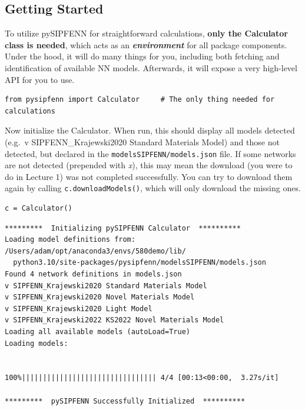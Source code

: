 \hypertarget{getting-started}{%
\subsection{Getting Started}\label{pysipfenntutorial2:getting-started}}

To utilize pySIPFENN for straightforward calculations, \textbf{only the
Calculator class is needed}, which acts as an
\textbf{\emph{environment}} for all package components. Under the hood,
it will do many things for you, including both fetching and
identification of available NN models. Afterwards, it will expose a very
high-level API for you to use.

\begin{verbatim}
from pysipfenn import Calculator     # The only thing needed for calculations
\end{verbatim}

Now initialize the Calculator. When run, this should display all models
detected (e.g.~v SIPFENN\_Krajewski2020 Standard Materials Model) and
those not detected, but declared in the
\texttt{modelsSIPFENN/models.json} file. If some
networks are not detected (prepended with \emph{x}), this may mean the
download (you were to do in Lecture 1) was not completed successfully.
You can try to download them again by calling
\texttt{c.downloadModels()}, which will only download
the missing ones.

\begin{verbatim}
c = Calculator()
\end{verbatim}

\begin{verbatim}
*********  Initializing pySIPFENN Calculator  **********
Loading model definitions from: /Users/adam/opt/anaconda3/envs/580demo/lib/
  python3.10/site-packages/pysipfenn/modelsSIPFENN/models.json
Found 4 network definitions in models.json
v SIPFENN_Krajewski2020 Standard Materials Model
v SIPFENN_Krajewski2020 Novel Materials Model
v SIPFENN_Krajewski2020 Light Model
v SIPFENN_Krajewski2022 KS2022 Novel Materials Model
Loading all available models (autoLoad=True)
Loading models:


100%|||||||||||||||||||||||||||||||| 4/4 [00:13<00:00,  3.27s/it]

*********  pySIPFENN Successfully Initialized  **********
\end{verbatim}

